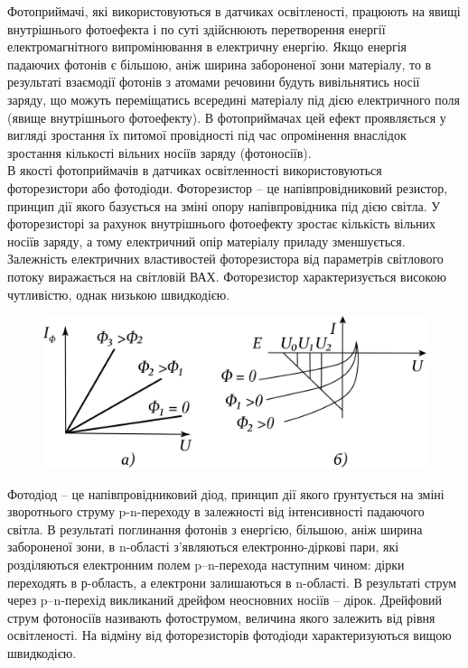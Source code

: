 \documentclass[a4paper,14pt]{extreport}
\begin{document}
Фотоприймачі, які використовуються в датчиках освітленості, працюють на
явищі внутрішнього фотоефекта і по суті здійснюють перетворення енергії
електромагнітного випромінювання в електричну енергію. Якщо енергія
падаючих фотонів є більшою, аніж ширина забороненої зони матеріалу, то в
результаті взаємодії фотонів з атомами речовини будуть вивільнятись носії
заряду, що можуть переміщатись всередині матеріалу під дією електричного поля
(явище внутрішнього фотоефекту). В фотоприймачах цей ефект проявляється у
вигляді зростання їх питомої провідності під час опромінення внаслідок
зростання кількості вільних носіїв заряду (фотоносіїв).\\

В якості фотоприймачів в датчиках освітленності використовуються
фоторезистори або фотодіоди. Фоторезистор – це напівпровідниковий резистор, принцип дії якого базується на зміні опору напівпровідника під дією світла. У
фоторезисторі за рахунок внутрішнього фотоефекту зростає кількість вільних
носіїв заряду, а тому електричний опір матеріалу приладу зменшується.
Залежність електричних властивостей фоторезистора від параметрів світлового
потоку виражається на світловій ВАХ. Фоторезистор характеризується
високою чутливістю, однак низькою швидкодією.\\

\begin{figure}[!h]\CenterFloatBoxes\TopFloatBoxes
{\includegraphics[scale=1]{11}}
\end{figure}

Фотодіод – це напівпровідниковий діод, принцип дії якого ґрунтується на
зміні зворотнього струму p-n-переходу в залежності від інтенсивності падаючого
світла. В результаті поглинання фотонів з енергією, більшою, аніж ширина
забороненої зони, в n-області з’являються електронно-діркові пари, які
розділяються електронним полем p–n-перехода наступним чином: дірки
переходять в р-область, а електрони залишаються в n-області. В результаті струм
через p–n-перехід викликаний дрейфом неосновних носіїв – дірок. Дрейфовий
струм фотоносіїв називають фотострумом, величина якого залежить від рівня
освітленості. На відміну від фоторезисторів фотодіоди характеризуються
вищою швидкодією.\\
\end{document}
